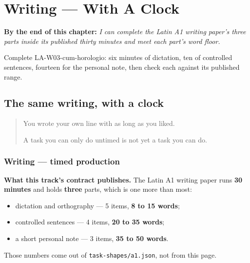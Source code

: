 
\chapter{Writing --- With A Clock}
\label{ch:la-cum-horologio}

\begin{chapteropening}
\textbf{By the end of this chapter:} \emph{I can complete the Latin A1 writing paper's three parts inside its published thirty minutes and meet each part's word floor.}

Complete LA-W03-cum-horologio: six minutes of dictation, ten of controlled sentences, fourteen for the personal note, then check each against its published range.
\end{chapteropening}

\section[(cum horologio)]{The same writing, with a clock}

\label{lesson:LA-W03-cum-horologio}



\begin{quote}
You wrote your own line with as long as you liked.

A task you can only do untimed is not yet a task you can do.
\end{quote}

\subsection*{Writing — timed production}
\textbf{What this track's contract publishes.} The Latin A1 writing paper runs \textbf{30 minutes} and holds \textbf{three} parts, which is one more than most:

\begin{itemize}
\raggedright
  \item dictation and orthography — 5 items, \textbf{8 to 15 words};
  \item controlled sentences — 4 items, \textbf{20 to 35 words};
  \item a short personal note — 3 items, \textbf{35 to 50 words}.
\end{itemize}

Those numbers come out of \texttt{task-shapes/a1.json}, not from this page.

